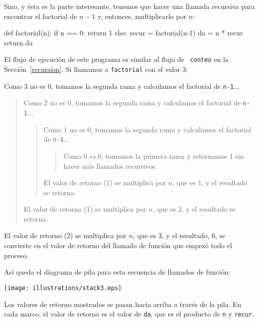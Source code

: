 Sino, y ésta es la parte interesante, tenemos que hacer una
llamada recursiva para encontrar el factorial de $n-1$ y, entonces,  
multiplicarlo por $n$:

\beforeverb
\begin{pythoncode}
def factorial(n):
  if n == 0:
    return 1
  else:
    recur = factorial(n-1)
    da = n * recur
    return da
\end{pythoncode}
\afterverb
%

El flujo de ejecución de este programa es similar al flujo de {\tt
conteo} en la Sección~\ref{recursion}.  Si llamamos a \texttt{factorial} con 
el valor 3:


Como  3 no es 0, tomamos la segunda rama y calculamos el factorial
de \texttt{n-1}...

\begin{quote}
Como  2 no es 0, tomamos la segunda rama y calculamos el factorial de
\texttt{n-1}...


  \begin{quote}
  Como  1 no es 0, tomamos la segunda rama y calculamos el factorial
  de \texttt{n-1}...


    \begin{quote}
    Como  0 {\em es} 0, tomamos la primera rama y retornamos 1
    sin hacer más llamados recursivos.
    \end{quote}


  El valor de retorno  (1) se multiplica por $n$, que es 1, y el 
  resultado se retorna.
  \end{quote}


El valor de retorno (1) se multiplica por $n$, que es 2, y el 
resultado se retorna.
\end{quote}


El valor de retorno (2) se multiplica por $n$, que es 3, y el resultado, 6,
se convierte en el valor de retorno del llamado de función que empezó todo
el proceso.

Así queda el diagrama de pila para esta secuencia de llamados de función:

\vspace{0.1in}
\beforefig
\centerline{\texttt{[image: illustrations/stack3.eps]}}
\afterfig
\vspace{0.1in}

Los valores de retorno mostrados se pasan hacia arriba a través de la pila.
En cada marco, el valor de retorno es el valor de  \texttt{da},
 que es el producto de \texttt{n} y \texttt{recur}.

